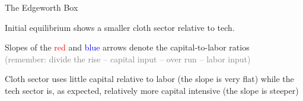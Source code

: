 \documentclass[notes,11pt, aspectratio=169, xcolor=table]{beamer}
\newenvironment{wideitemize}{\itemize\addtolength{\itemsep}{10pt}}{\enditemize}
\begin{document}
\begin{frame}{The Edgeworth Box}

\begin{wideitemize}
    \item Initial equilibrium shows a smaller
cloth sector relative to tech.
    \item Slopes of the \textcolor{red}{red} and \textcolor{blue}{blue} arrows denote the capital-to-labor ratios \\
    \qquad \textcolor{gray}{(remember: divide the rise – capital input – over run – labor input)}
    \item Cloth sector uses little capital relative to labor (the slope is very flat) while the tech sector is, as expected, relatively more capital intensive (the slope is steeper)
\end{wideitemize}


\end{frame}
\end{document}
